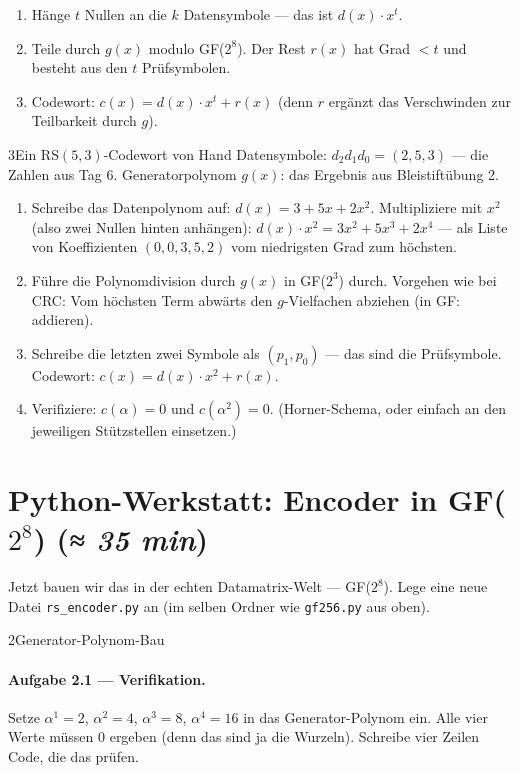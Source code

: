 \begin{enumerate}
\item Hänge $t$ Nullen an die $k$ Datensymbole — das ist
  $d(x) \cdot x^t$.
\item Teile durch $g(x)$ modulo GF($2^8$). Der Rest $r(x)$ hat Grad
  $< t$ und besteht aus den $t$ Prüfsymbolen.
\item Codewort: $c(x) = d(x) \cdot x^t + r(x)$ (denn $r$ ergänzt
  das Verschwinden zur Teilbarkeit durch $g$).
\end{enumerate}

\begin{bleistiftuebung}{3}{Ein RS$(5,3)$-Codewort von Hand}
Datensymbole: $d_2 d_1 d_0 = (2, 5, 3)$ — die Zahlen aus
Tag 6. Generatorpolynom $g(x)$: das Ergebnis aus Bleistiftübung 2.

\begin{enumerate}[label=(\alph*), leftmargin=*]
\item Schreibe das Datenpolynom auf:
  $d(x) = 3 + 5x + 2x^2$. Multipliziere mit $x^2$ (also zwei Nullen
  hinten anhängen): $d(x) \cdot x^2 = 3 x^2 + 5 x^3 + 2 x^4$ — als
  Liste von Koeffizienten $(0, 0, 3, 5, 2)$ vom niedrigsten Grad
  zum höchsten.
\item Führe die Polynomdivision durch $g(x)$ in GF($2^3$) durch.
  Vorgehen wie bei CRC: Vom höchsten Term abwärts den $g$-Vielfachen
  abziehen (in GF: addieren).
\item Schreibe die letzten zwei Symbole als $(p_1, p_0)$ — das sind
  die Prüfsymbole. Codewort:
  $c(x) = d(x) \cdot x^2 + r(x)$.
\item Verifiziere: $c(\alpha) = 0$ und $c(\alpha^2) = 0$.
  (Horner-Schema, oder einfach an den jeweiligen Stützstellen
  einsetzen.)
\end{enumerate}
\end{bleistiftuebung}

\section{Python-Werkstatt: Encoder in GF($2^8$) \normalfont(\textit{≈ 35 min})}

Jetzt bauen wir das in der echten Datamatrix-Welt — GF($2^8$). Lege
eine neue Datei \texttt{rs\_encoder.py} an (im selben Ordner wie
\texttt{gf256.py} aus oben).

\begin{pythoneinheit}{2}{Generator-Polynom-Bau}

\paragraph{Aufgabe 2.1 — Verifikation.}
Setze $\alpha^1 = 2$, $\alpha^2 = 4$, $\alpha^3 = 8$, $\alpha^4 = 16$
in das Generator-Polynom ein. Alle vier Werte müssen 0 ergeben (denn
das sind ja die Wurzeln). Schreibe vier Zeilen Code, die das prüfen.
\end{pythoneinheit}

